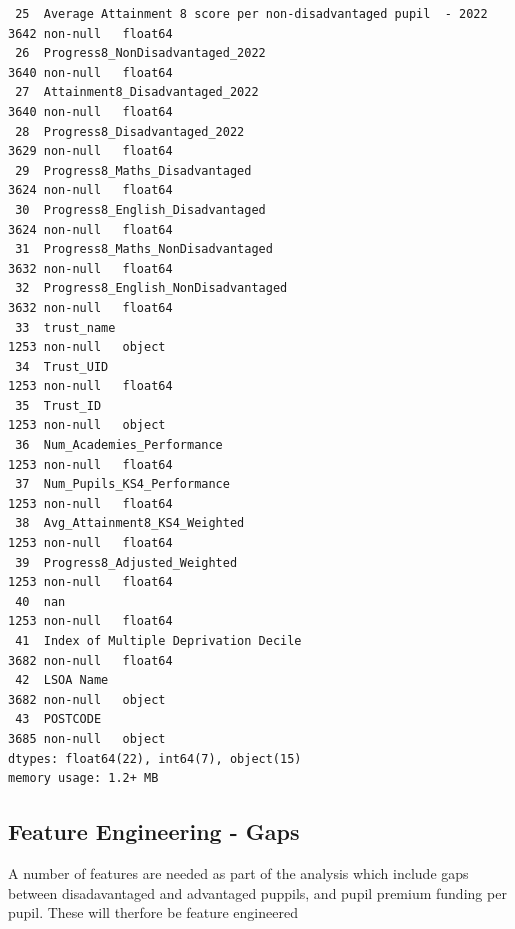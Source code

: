 \documentclass[
  letterpaper,
  DIV=11,
  numbers=noendperiod]{scrartcl}
\begin{document}
\begin{verbatim}
 25  Average Attainment 8 score per non-disadvantaged pupil  - 2022  3642 non-null   float64
 26  Progress8_NonDisadvantaged_2022                                 3640 non-null   float64
 27  Attainment8_Disadvantaged_2022                                  3640 non-null   float64
 28  Progress8_Disadvantaged_2022                                    3629 non-null   float64
 29  Progress8_Maths_Disadvantaged                                   3624 non-null   float64
 30  Progress8_English_Disadvantaged                                 3624 non-null   float64
 31  Progress8_Maths_NonDisadvantaged                                3632 non-null   float64
 32  Progress8_English_NonDisadvantaged                              3632 non-null   float64
 33  trust_name                                                      1253 non-null   object 
 34  Trust_UID                                                       1253 non-null   float64
 35  Trust_ID                                                        1253 non-null   object 
 36  Num_Academies_Performance                                       1253 non-null   float64
 37  Num_Pupils_KS4_Performance                                      1253 non-null   float64
 38  Avg_Attainment8_KS4_Weighted                                    1253 non-null   float64
 39  Progress8_Adjusted_Weighted                                     1253 non-null   float64
 40  nan                                                             1253 non-null   float64
 41  Index of Multiple Deprivation Decile                            3682 non-null   float64
 42  LSOA Name                                                       3682 non-null   object 
 43  POSTCODE                                                        3685 non-null   object 
dtypes: float64(22), int64(7), object(15)
memory usage: 1.2+ MB
\end{verbatim}

\subsection{Feature Engineering -
Gaps}\label{feature-engineering---gaps}

A number of features are needed as part of the analysis which include
gaps between disadavantaged and advantaged puppils, and pupil premium
funding per pupil. These will therfore be feature engineered
\end{document}
